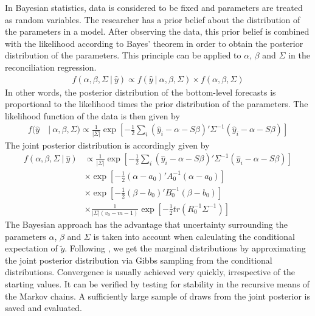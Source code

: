 \documentclass[a4paper,fleqn,11pt]{article}
\begin{document}
In Bayesian statistics, data is considered to be fixed and parameters are treated as random variables. The researcher has a prior belief about the distribution of the parameters in a model. After observing the data, this prior belief is combined with the likelihood according to Bayes' theorem in order to obtain the posterior distribution of the parameters. This principle can be applied to $\alpha$, $\beta$ and $\Sigma$ in the reconciliation regression.
\begin{align}
	f(\alpha, \beta, \Sigma\ |\ \hat{y}) \propto f(\hat{y}\ |\ \alpha, \beta, \Sigma) \times f(\alpha, \beta, \Sigma)
\end{align}
In other words, the posterior distribution of the bottom-level forecasts is proportional to the likelihood times the prior distribution of the parameters. The likelihood function of the data is then given by
\begin{align*}
f(\hat{y}\ &|\ \alpha,\beta,\Sigma) \propto \frac{1}{|\Sigma|} \exp\left[-\frac{1}{2} \sum_i  (\hat{y}_i - \alpha - S\beta)'\Sigma^{-1}(\hat{y}_i - \alpha - S\beta)\right]
\end{align*}
The joint posterior distribution is accordingly given by
\begin{align*}
f(\alpha,\beta,\Sigma\ |\ \hat{y}) & \propto \frac{1}{|\Sigma|} \exp\left[-\frac{1}{2} \sum_i  (\hat{y}_i - \alpha - S\beta)'\Sigma^{-1}(\hat{y}_i - \alpha - S\beta)\right] \\
&\times \exp \left[-\frac{1}{2}(\alpha - a_0)'A_0^{-1}(\alpha - a_0)\right] \\
&\times \exp \left[-\frac{1}{2}(\beta - b_0)'B_0^{-1}(\beta - b_0)\right] \\
&\times \frac{1}{|\Sigma|(v_0 - m - 1)} \exp \left[-\frac{1}{2} tr(R_0^{-1}\Sigma^{-1}) \right]
\end{align*}
The Bayesian approach has the advantage that uncertainty surrounding the parameters $\alpha$, $\beta$ and $\Sigma$ is taken into account when calculating the conditional expectation of $\tilde{y}$. Following \cite{Percy1992}, we get the marginal distributions by approximating the joint posterior distribution via Gibbs sampling from the conditional distributions.  Convergence is usually achieved very quickly, irrespective of the starting values. It can be verified by testing for stability in the recursive means of the Markov chains. A sufficiently large sample of draws from the joint posterior is saved and evaluated.
\end{document}
